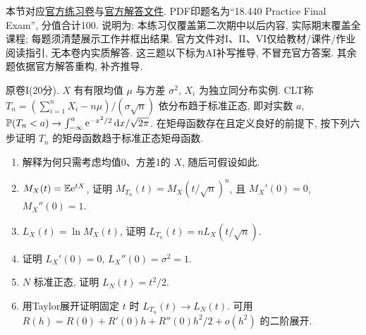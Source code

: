 本节对应\href{https://ocw.mit.edu/courses/18-600-probability-and-random-variables-fall-2019/resources/mit18_600f19_prc_final/}{官方练习卷}与\href{https://ocw.mit.edu/courses/18-600-probability-and-random-variables-fall-2019/resources/mit18_600f19_prc_final_soln/}{官方解答文件}. PDF印题名为``18.440 Practice Final Exam'', 分值合计100. 说明为: 本练习仅覆盖第二次期中以后内容, 实际期末覆盖全课程; 每题须清楚展示工作并框出结果. 官方文件对I、II、VI仅给教材/课件/作业阅读指引, 无本卷内实质解答. 这三题以下标为AI补写推导, 不冒充官方答案. 其余题依据官方解答重构, 补齐推导.

\begin{exercise}\label{ex:flp-I}
原卷I(20分). $X$ 有有限均值 $\mu$ 与方差 $\sigma^2$, $X_i$ 为独立同分布实例. CLT称 $T_n=(\sum_{i=1}^nX_i-n\mu)/(\sigma\sqrt n)$ 依分布趋于标准正态, 即对实数 $a$,
$\mathbb P(T_n<a)\to\int_{-\infty}^a\mathrm e^{-x^2/2}\,\mathrm d x/\sqrt{2\pi}$. 在矩母函数存在且定义良好的前提下, 按下列六步证明 $T_n$ 的矩母函数趋于标准正态矩母函数.
\begin{enumerate}
\item 解释为何只需考虑均值0、方差1的 $X$, 随后可假设如此.
\item $M_X(t)=\mathbb E\mathrm e^{tX}$, 证明 $M_{T_n}(t)=M_X(t/\sqrt n)^n$, 且 $M_X'(0)=0$, $M_X''(0)=1$.
\item $L_X(t)=\ln M_X(t)$, 证明 $L_{T_n}(t)=nL_X(t/\sqrt n)$.
\item 证明 $L_X'(0)=0$, $L_X''(0)=\sigma^2=1$.
\item $N$ 标准正态, 证明 $L_N(t)=t^2/2$.
\item 用Taylor展开证明固定 $t$ 时 $L_{T_n}(t)\to L_N(t)$. 可用 $R(h)=R(0)+R'(0)h+R''(0)h^2/2+o(h^2)$ 的二阶展开.
\end{enumerate}
\end{exercise}
